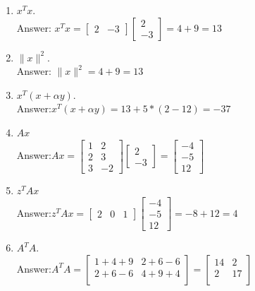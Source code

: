 \documentclass{article}
\def\norm#1{\|#1\|}
\def\enum#1{\begin{enumerate}#1\end{enumerate}}
\begin{document}
\enum{
\item $x^Tx$.
\textcolor{gre}{\\Answer: $x^Tx=\left[\begin{array}{cc}
2 & -3
\end{array}\right]\left[\begin{array}{c}
2\\
-3
\end{array}\right]=4+9=13$
}
\item $\norm{x}^2$.
\textcolor{gre}{\\Answer: $\norm{x}^2=4+9=13$}
\item $x^T(x + \alpha y)$.
\textcolor{gre}{\\Answer:$x^T(x + \alpha y)=13+5*(2-12)=-37$}
\item $Ax$
\textcolor{gre}{\\Answer:$Ax=\left[\begin{array}{cc}
1 & 2\\
2&3\\
3&-2
\end{array}\right]\left[\begin{array}{c}
2\\
-3
\end{array}\right]=\left[\begin{array}{c}
-4\\
-5\\
12
\end{array}\right]$}
\item $z^TAx$
\textcolor{gre}{\\Answer:$z^TAx=\left[\begin{array}{ccc}
2 & 0&1
\end{array}\right]\left[\begin{array}{c}
-4\\
-5\\
12
\end{array}\right]=-8+12=4$}
\item $A^TA$.
\textcolor{gre}{\\Answer:$A^TA=\left[\begin{array}{cc}
1+4+9 & 2+6-6\\
2+6-6 & 4+9+4\\
\end{array}\right]=\left[\begin{array}{cc}
14 & 2\\
2 & 17\\
\end{array}\right]$}
}
\end{document}
